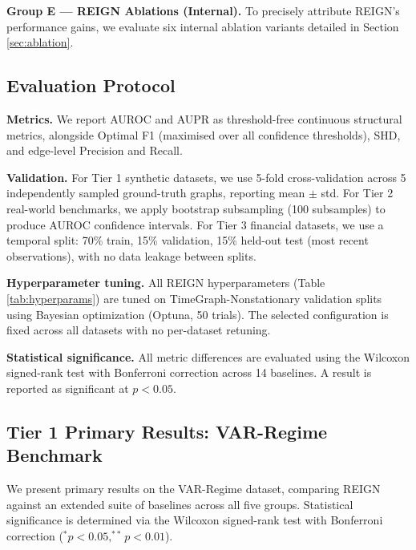 \textbf{Group E — REIGN Ablations (Internal).} To precisely attribute REIGN's performance gains, we evaluate six internal ablation variants detailed in Section \ref{sec:ablation}.

\subsection{Evaluation Protocol}

\textbf{Metrics.} We report AUROC and AUPR as threshold-free continuous structural metrics, alongside Optimal F1 (maximised over all confidence thresholds), SHD, and edge-level Precision and Recall.

\textbf{Validation.} For Tier 1 synthetic datasets, we use 5-fold cross-validation across 5 independently sampled ground-truth graphs, reporting mean $\pm$ std. For Tier 2 real-world benchmarks, we apply bootstrap subsampling (100 subsamples) to produce AUROC confidence intervals. For Tier 3 financial datasets, we use a temporal split: 70\% train, 15\% validation, 15\% held-out test (most recent observations), with no data leakage between splits.

\textbf{Hyperparameter tuning.} All REIGN hyperparameters (Table \ref{tab:hyperparams}) are tuned on TimeGraph-Nonstationary validation splits using Bayesian optimization (Optuna, 50 trials). The selected configuration is fixed across all datasets with no per-dataset retuning.

\textbf{Statistical significance.} All metric differences are evaluated using the Wilcoxon signed-rank test with Bonferroni correction across 14 baselines. A result is reported as significant at $p < 0.05$.

\subsection{Tier 1 Primary Results: VAR-Regime Benchmark}

\begin{revenv}We present primary results on the VAR-Regime dataset, comparing REIGN against an extended suite of baselines across all five groups. Statistical significance is determined via the Wilcoxon signed-rank test with Bonferroni correction ($^*p < 0.05, ^{**}p < 0.01$).\end{revenv}

